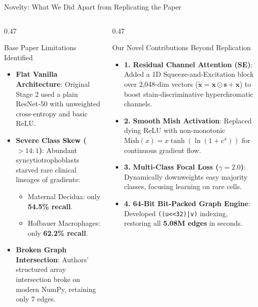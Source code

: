 \documentclass[aspectratio=169, 10pt]{beamer}
\begin{document}
\begin{frame}{Novelty: What We Did Apart from Replicating the Paper}
\begin{columns}[onlytextwidth, t]
  \begin{column}{0.47\textwidth}
    \begin{alertblock}{Base Paper Limitations Identified}
      \parbox[t][4.8cm][t]{\linewidth}{
        \begin{itemize}\footnotesize
          \item \textbf{Flat Vanilla Architecture}: Original Stage 2 used a plain ResNet-50 with unweighted cross-entropy and basic ReLU.
          \item \textbf{Severe Class Skew ($>14:1$)}: Abundant syncytiotrophoblasts starved rare clinical lineages of gradients:
            \begin{itemize}\scriptsize
              \item Maternal Decidua: only \textbf{54.5\% recall}.
              \item Hofbauer Macrophages: only \textbf{62.2\% recall}.
            \end{itemize}
          \item \textbf{Broken Graph Intersection}: Authors' structured array intersection broke on modern NumPy, retaining only 7 edges.
        \end{itemize}
      }
    \end{alertblock}
  \end{column}
  \hfill
  \begin{column}{0.47\textwidth}
    \begin{block}{Our Novel Contributions Beyond Replication}
      \parbox[t][4.8cm][t]{\linewidth}{
        \begin{itemize}\footnotesize
          \item \textbf{1. Residual Channel Attention (SE)}: Added a 1D Squeeze-and-Excitation block over 2,048-dim vectors ($\mathbf{\tilde{x}} = \mathbf{x} \odot \mathbf{s} + \mathbf{x}$) to boost stain-discriminative hyperchromatic channels.
          \item \textbf{2. Smooth Mish Activation}: Replaced dying ReLU with non-monotonic $\text{Mish}(x) = x \tanh(\ln(1+e^x))$ for continuous gradient flow.
          \item \textbf{3. Multi-Class Focal Loss ($\gamma = 2.0$)}: Dynamically downweights easy majority classes, focusing learning on rare cells.
          \item \textbf{4. 64-Bit Bit-Packed Graph Engine}: Developed \texttt{((u<<32)|v)} indexing, restoring all \textbf{5.08M edges} in seconds.
        \end{itemize}
      }
    \end{block}
  \end{column}
\end{columns}
\end{frame}
\end{document}
